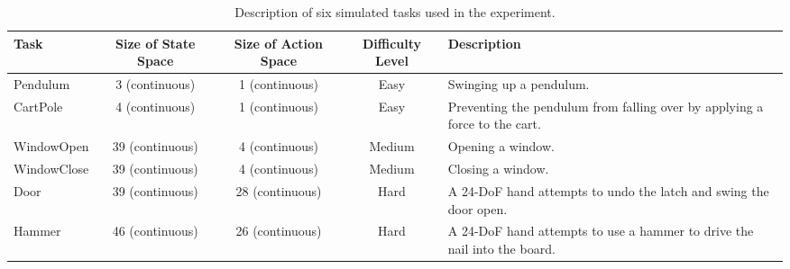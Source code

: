\begin{landscape}

  \begin{table}[H]
    \caption{Description of six simulated tasks used in the experiment.\label{tab:Tasks}}

    \begin{tabular}{lcccp{5.5cm}}
      \toprule
      \textbf{Task}                               & \textbf{Size of State Space} & \textbf{Size of Action Space}                                              & \textbf{Difficulty Level} & \textbf{Description} \\
      \midrule
      Pendulum \cite{Env_OpenAIGym}               & 3 (continuous)               & 1 (continuous)
                                                  & Easy                         & Swinging up a pendulum.                                                                                                       \\
      CartPole \cite{Env_OpenAIGym, Env_CartPole} & 4 (continuous)               & 1 (continuous)
                                                  & Easy                         & Preventing the pendulum from falling over by applying a force to the cart.                                                    \\
      WindowOpen \cite{Env_MetaWorld}             & 39 (continuous)              & 4 (continuous)
                                                  & Medium                       & Opening a window.                                                                                                             \\
      WindowClose \cite{Env_MetaWorld}            & 39 (continuous)              & 4 (continuous)
                                                  & Medium                       & Closing a window.                                                                                                             \\
      Door \cite{Env_Adroit}                      & 39 (continuous)              & 28 (continuous)
                                                  & Hard                         & A 24-DoF hand attempts to undo the latch and swing the door open.                                                             \\
      Hammer \cite{Env_Adroit}                    & 46 (continuous)              & 26 (continuous)
                                                  & Hard                         & A 24-DoF hand attempts to use a hammer to drive the nail into the board.                                                      \\
      \bottomrule
    \end{tabular}
  \end{table}
\end{landscape}


